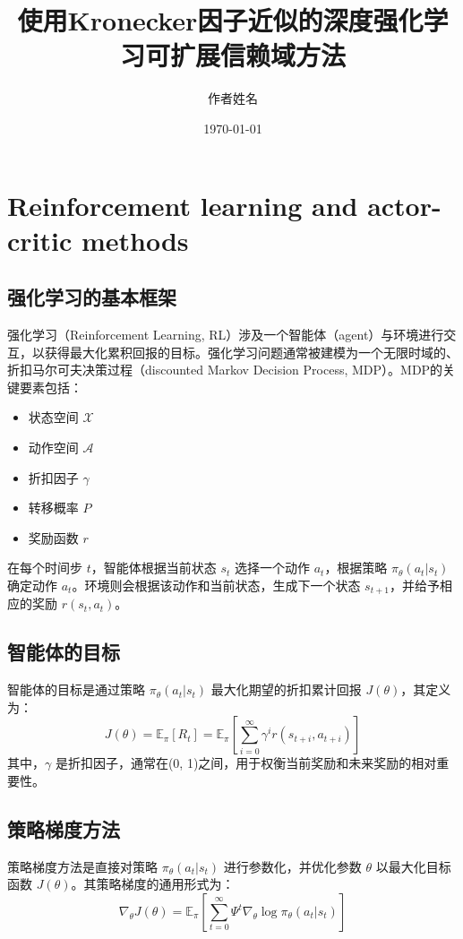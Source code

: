 \documentclass[twocolumn, 10pt]{article} %
\theoremstyle{remark}
\begin{document}
\title{使用Kronecker因子近似的深度强化学习可扩展信赖域方法}
\author{作者姓名}
\date{\today}
\maketitle


\section{Reinforcement learning and actor-critic methods}

\subsection{强化学习的基本框架}
强化学习（Reinforcement Learning, RL）涉及一个智能体（agent）与环境进行交互，以获得最大化累积回报的目标。强化学习问题通常被建模为一个无限时域的、折扣马尔可夫决策过程（discounted Markov Decision Process, MDP）。MDP的关键要素包括：
\begin{itemize}
    \item 状态空间 $\mathcal{X}$
    \item 动作空间 $\mathcal{A}$
    \item 折扣因子 $\gamma$
    \item 转移概率 $P$
    \item 奖励函数 $r$
\end{itemize}

在每个时间步 $t$，智能体根据当前状态 $s_t$ 选择一个动作 $a_t$，根据策略 $\pi_\theta(a_t | s_t)$ 确定动作 $a_t$。环境则会根据该动作和当前状态，生成下一个状态 $s_{t+1}$，并给予相应的奖励 $r(s_t, a_t)$。

\subsection{智能体的目标}
智能体的目标是通过策略 $\pi_\theta(a_t | s_t)$ 最大化期望的折扣累计回报 $J(\theta)$，其定义为：
\[
    J(\theta) = \mathbb{E}_\pi[R_t] = \mathbb{E}_\pi\left[\sum_{i=0}^{\infty} \gamma^i r(s_{t+i}, a_{t+i})\right]
\]
其中，$\gamma$ 是折扣因子，通常在(0, 1)之间，用于权衡当前奖励和未来奖励的相对重要性。

\subsection{策略梯度方法}
策略梯度方法是直接对策略 $\pi_\theta(a_t | s_t)$ 进行参数化，并优化参数 $\theta$ 以最大化目标函数 $J(\theta)$。其策略梯度的通用形式为：
\[
    \nabla_\theta J(\theta) = \mathbb{E}_\pi\left[\sum_{t=0}^{\infty} \Psi^t \nabla_\theta \log \pi_\theta(a_t | s_t)\right]
\]
\end{document}
